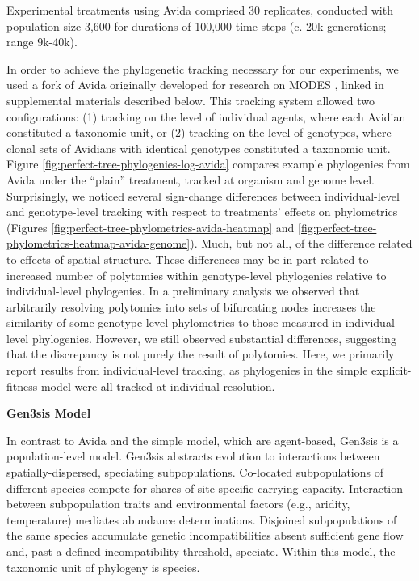 

Experimental treatments using Avida comprised 30 replicates, conducted with population size 3,600 for durations of 100,000 time steps (c. 20k generations; range 9k-40k).

In order to achieve the phylogenetic tracking necessary for our experiments, we used a fork of Avida originally developed for research on MODES \citep{dolson2019modes}, linked in supplemental materials described below.
This tracking system allowed two configurations: (1) tracking on the level of individual agents, where each Avidian constituted a taxonomic unit, or (2) tracking on the level of genotypes, where clonal sets of Avidians with identical genotypes constituted a taxonomic unit.
Figure \ref{fig:perfect-tree-phylogenies-log-avida} compares example phylogenies from Avida under the ``plain'' treatment, tracked at organism and genome level.
Surprisingly, we noticed several sign-change differences between individual-level and genotype-level tracking with respect to treatments' effects on phylometrics (Figures \ref{fig:perfect-tree-phylometrics-avida-heatmap} and \ref{fig:perfect-tree-phylometrics-heatmap-avida-genome}).
Much, but not all, of the difference related to effects of spatial structure.
These differences may be in part related to increased number of polytomies within genotype-level phylogenies relative to individual-level phylogenies.
In a preliminary analysis we observed that arbitrarily resolving polytomies into sets of bifurcating nodes increases the similarity of some genotype-level phylometrics to those measured in individual-level phylogenies.
However, we still observed substantial differences, suggesting that the discrepancy is not purely the result of polytomies.
Here, we primarily report results from individual-level tracking, as phylogenies in the simple explicit-fitness model were all tracked at individual resolution.

\noindent
\textbf{Gen3sis Model}


\noindent
In contrast to Avida and the simple model, which are agent-based, Gen3sis is a population-level model.
Gen3sis abstracts evolution to interactions between spatially-dispersed, speciating subpopulations.
Co-located subpopulations of different species compete for shares of site-specific carrying capacity.
Interaction between subpopulation traits and environmental factors (e.g., aridity, temperature) mediates abundance determinations.
Disjoined subpopulations of the same species accumulate genetic incompatibilities absent sufficient gene flow and, past a defined incompatibility threshold, speciate.
Within this model, the taxonomic unit of phylogeny is species.

